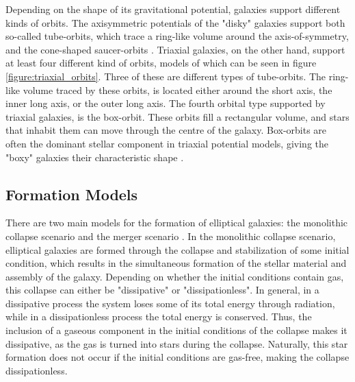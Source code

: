 \documentclass[english, twoside]{HYgradu}
\begin{document}
Depending on the shape of its gravitational potential, galaxies support different kinds of orbits. The axisymmetric potentials of the "disky" galaxies support both so-called tube-orbits, which trace a ring-like volume around the axis-of-symmetry, and the cone-shaped saucer-orbits \citep{MerrittBook}. Triaxial galaxies, on the other hand, support at least four different kind of orbits, models of which can be seen in figure \ref{figure:triaxial_orbits}. Three of these are different types of tube-orbits. The ring-like volume traced by these orbits, is located either around the short axis, the inner long axis, or the outer long axis. The fourth orbital type supported by triaxial galaxies, is the box-orbit. These orbits fill a rectangular volume, and stars that inhabit them can move through the centre of the galaxy. Box-orbits are often the dominant stellar component in triaxial potential models, giving the "boxy" galaxies their characteristic shape \citep{BinneyTremaine}.


\subsection{Formation Models}

There are two main models for the formation of elliptical galaxies: the monolithic collapse scenario and the merger scenario \citep{GalaxyFormationAndEvo2010}. In the monolithic collapse scenario, elliptical galaxies are formed through the collapse and stabilization of some initial condition, which results in the simultaneous formation of the stellar material and assembly of the galaxy. Depending on whether the initial conditions contain gas, this collapse can either be "dissipative" or "dissipationless". In general, in a dissipative process the system loses some of its total energy through radiation, while in a dissipationless process the total energy is conserved. Thus, the inclusion of a gaseous component in the initial conditions of the collapse makes it dissipative, as the gas is turned into stars during the collapse. Naturally, this star formation does not occur if the initial conditions are gas-free, making the collapse dissipationless.
\end{document}
